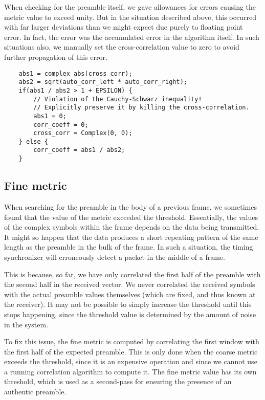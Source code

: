 When checking for the preamble itself, we gave allowances for errors causing
the metric value to exceed unity. But in the situation described above, this
occurred with far larger deviations than we might expect due purely to floating
point error. In fact, the error was the accumulated error in the algorithm
itself. In such situations also, we manually set the cross-correlation value to
zero to avoid further propagation of this error.

\begin{lstlisting}
	abs1 = complex_abs(cross_corr);
	abs2 = sqrt(auto_corr_left * auto_corr_right);
	if(abs1 / abs2 > 1 + EPSILON) {
		// Violation of the Cauchy-Schwarz inequality!
		// Explicitly preserve it by killing the cross-correlation.
		abs1 = 0;
		corr_coeff = 0;
		cross_corr = Complex(0, 0);
	} else {
		corr_coeff = abs1 / abs2;
	}
\end{lstlisting}

\subsection{Fine metric}
\label{subsec:fine-metric}

When searching for the preamble in the body of a previous frame, we sometimes
found that the value of the metric exceeded the threshold. Essentially, the
values of the complex symbols within the frame depends on the data being
transmitted. It might so happen that the data produces a short repeating
pattern of the same length as the preamble in the bulk of the frame. In such a
situation, the timing synchronizer will erroneously detect a packet in the
middle of a frame.

This is because, so far, we have only correlated the first half of the preamble
with the second half in the received vector. We never correlated the received
symbols with the actual preamble values themselves (which are fixed, and thus
known at the receiver). It may not be possible to simply increase the threshold
until this stops happening, since the threshold value is determined by the
amount of noise in the system. %

To fix this issue, the fine metric is computed by correlating the first window
with the first half of the expected preamble. This is only done when the coarse
metric exceeds the threshold, since it is an expensive operation and since we
cannot use a running correlation algorithm to compute it. The fine metric value
has its own threshold, which is used as a second-pass for ensuring the presence
of an authentic preamble.

